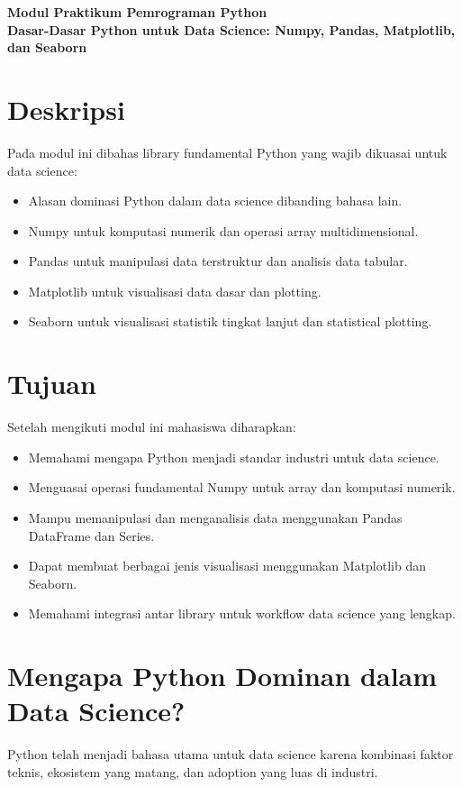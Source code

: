 \begin{center}
\textbf{Modul Praktikum Pemrograman Python} \\
\textbf{Dasar-Dasar Python untuk Data Science: Numpy, Pandas, Matplotlib, dan Seaborn}
\end{center}

\section*{Deskripsi}
Pada modul ini dibahas library fundamental Python yang wajib dikuasai untuk data science:
\begin{itemize}
  \item Alasan dominasi Python dalam data science dibanding bahasa lain.
  \item Numpy untuk komputasi numerik dan operasi array multidimensional.
  \item Pandas untuk manipulasi data terstruktur dan analisis data tabular.
  \item Matplotlib untuk visualisasi data dasar dan plotting.
  \item Seaborn untuk visualisasi statistik tingkat lanjut dan statistical plotting.
\end{itemize}

\section*{Tujuan}
Setelah mengikuti modul ini mahasiswa diharapkan:
\begin{itemize}
  \item Memahami mengapa Python menjadi standar industri untuk data science.
  \item Menguasai operasi fundamental Numpy untuk array dan komputasi numerik.
  \item Mampu memanipulasi dan menganalisis data menggunakan Pandas DataFrame dan Series.
  \item Dapat membuat berbagai jenis visualisasi menggunakan Matplotlib dan Seaborn.
  \item Memahami integrasi antar library untuk workflow data science yang lengkap.
\end{itemize}

\section{Mengapa Python Dominan dalam Data Science?}

Python telah menjadi bahasa utama untuk data science karena kombinasi faktor teknis, ekosistem yang matang, dan adoption yang luas di industri.

